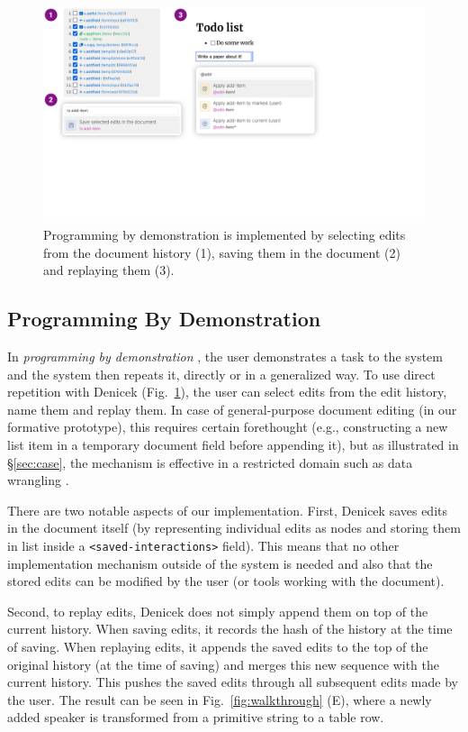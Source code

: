 \documentclass[sigconf]{acmart}
\begin{document}
\begin{figure}[t]
\includegraphics[width=0.9\columnwidth,clip,trim=0cm 7cm 9cm 0cm]{fig/pbd.pdf}
\vspace{-0.5em}
\caption{Programming by demonstration is implemented by selecting edits from the document
history (1), saving them in the document (2) and replaying them (3).}
\label{fig:pbd}
\vspace{-0.5em}
\end{figure}

\subsection{Programming By Demonstration}
\label{sec:impl-pbd}

In \emph{programming by demonstration} \cite{cypher-1993-pbd}, the user demonstrates a task to the
system and the system then repeats it, directly or in a generalized way. To use direct
repetition with Denicek (Fig.~\ref{fig:pbd}), the user can select edits from the edit history,
name them and replay them. In case of general-purpose document editing (in our formative prototype),
this requires certain forethought (e.g., constructing a new list item in a temporary document
field before appending it), but as illustrated in \S\ref{sec:case}, the mechanism is effective in
a restricted domain such as data wrangling \cite{kandel-2011-wrangler}.

There are two notable aspects of our implementation. First, Deni\-cek saves edits in the document
itself (by representing individual edits as nodes and storing them in list inside a
{\small\Verb_<saved-interactions>_} field). This means that no other implementation mechanism
outside of the system is needed and also that the stored edits can be modified by the user
(or tools working with the document).

Second, to replay edits, Denicek does not simply append them on top of the current history.
When saving edits, it records the hash of the history at the time of saving. When replaying edits,
it appends the saved edits to the top of the original history (at the time of saving) and merges this new
sequence with the current history. This pushes the saved edits through all subsequent edits made
by the user. The result can be seen in Fig.~\ref{fig:walkthrough} (E), where a newly added speaker
is transformed from a primitive string to a table row.
\end{document}
